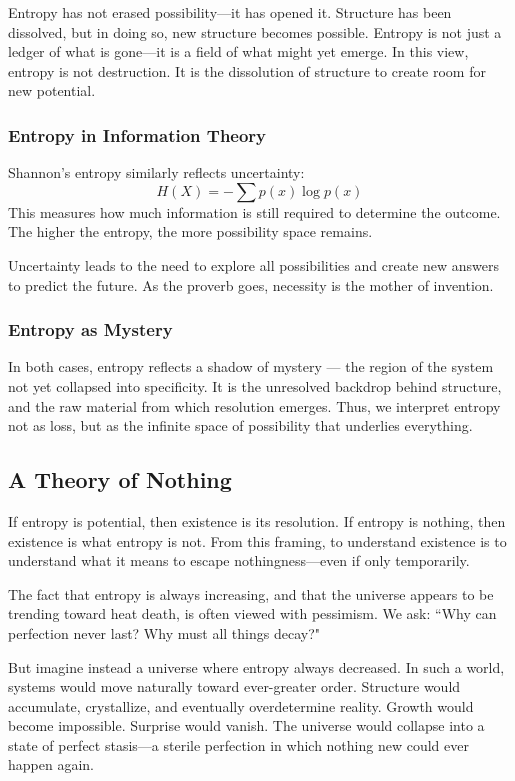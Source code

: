 \documentclass[12pt]{article}
\begin{document}
Entropy has not erased possibility—it has opened it. Structure has been dissolved, but in doing so, new structure becomes possible. Entropy is not just a ledger of what is gone—it is a field of what might yet emerge. In this view, entropy is not destruction. It is the dissolution of structure to create room for new potential.


\subsubsection{Entropy in Information Theory}

Shannon’s entropy similarly reflects uncertainty:
\[
H(X) = -\sum p(x) \log p(x)
\]
This measures how much information is still required to determine the outcome. The higher the entropy, the more possibility space remains.

Uncertainty leads to the need to explore all possibilities and create new answers to predict the future. As the proverb goes, necessity is the mother of invention.

\subsubsection{Entropy as Mystery}

In both cases, entropy reflects a shadow of mystery — the region of the system not yet collapsed into specificity. It is the unresolved backdrop behind structure, and the raw material from which resolution emerges. Thus, we interpret entropy not as loss, but as the infinite space of possibility that underlies everything.

\subsection{A Theory of Nothing}

If entropy is potential, then existence is its resolution. If entropy is nothing, then existence is what entropy is not. From this framing, to understand existence is to understand what it means to escape nothingness—even if only temporarily.

The fact that entropy is always increasing, and that the universe appears to be trending toward heat death, is often viewed with pessimism. We ask: ``Why can perfection never last? Why must all things decay?"

But imagine instead a universe where entropy always decreased. In such a world, systems would move naturally toward ever-greater order. Structure would accumulate, crystallize, and eventually overdetermine reality. Growth would become impossible. Surprise would vanish. The universe would collapse into a state of perfect stasis—a sterile perfection in which nothing new could ever happen again.
\end{document}
